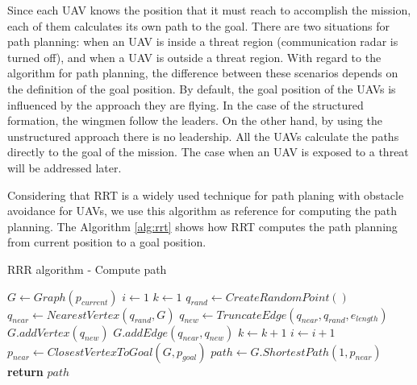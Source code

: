 Since each UAV knows the position that it must reach to accomplish the mission, each of them calculates its own path to the goal. There are two situations for path planning: when an UAV is inside a threat region (communication radar is turned off), and when a UAV is outside a threat region. With regard to the algorithm for path planning, the difference between these scenarios depends on the definition of the goal position. By default, the goal position of the UAVs is influenced by the approach they are flying. In the case of the structured formation, the wingmen follow the leaders. On the other hand, by using the unstructured approach there is no leadership. All the UAVs calculate the paths directly to the goal of the mission. The case when an UAV is exposed to a threat will be addressed later.

Considering that RRT is a widely used technique for path planing with obstacle avoidance for UAVs, we use this algorithm as reference for computing the path planning. The Algorithm \ref{alg:rrt} shows how RRT computes the path planning from current position to a goal position. 

\begin{algorithm}
\caption{RRR algorithm - Compute path}\label{alg:rrt}
\begin{algorithmic}[1]
\State $G\gets Graph(p_{current})$ 
\State $i\gets 1$
\State $k\gets 1$
\State $q_{rand}\gets CreateRandomPoint()$
\State $q_{near}\gets NearestVertex(q_{rand}, G)$
\State $q_{new}\gets TruncateEdge(q_{near}, q_{rand}, e_{length})$
\State $G.addVertex(q_{new})$
\State $G.addEdge(q_{near}, q_{new})$
\State $k\gets k+1$
\EndIf
\State $i\gets i+1$
\EndWhile\label{euclidendwhile}
\State $p_{near}\gets ClosestVertexToGoal(G, p_{goal})$ 
\State $path\gets G.ShortestPath(1, p_{near})$
\State \textbf{return} $path$
\EndProcedure
\end{algorithmic}
\end{algorithm}

